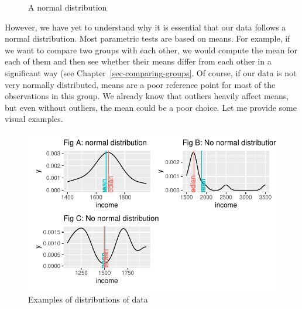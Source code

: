 \documentclass[
  letterpaper,
  DIV=11,
  numbers=noendperiod]{scrreprt}
\begin{document}
\begin{figure}


\caption{\label{fig-normal-distribution2}A normal distribution}

\end{figure}%

However, we have yet to understand why it is essential that our data
follows a normal distribution. Most parametric tests are based on means.
For example, if we want to compare two groups with each other, we would
compute the mean for each of them and then see whether their means
differ from each other in a significant way (see
Chapter~\ref{sec-comparing-groups}. Of course, if our data is not very
normally distributed, means are a poor reference point for most of the
observations in this group. We already know that outliers heavily affect
means, but even without outliers, the mean could be a poor choice. Let
me provide some visual examples.

\begin{figure}[H]

{\centering \includegraphics{09_sources_of_bias_files/figure-latex/comparing-distributions-plus-means-1.pdf}

}

\caption{Examples of distributions of data}

\end{figure}%
\end{document}
